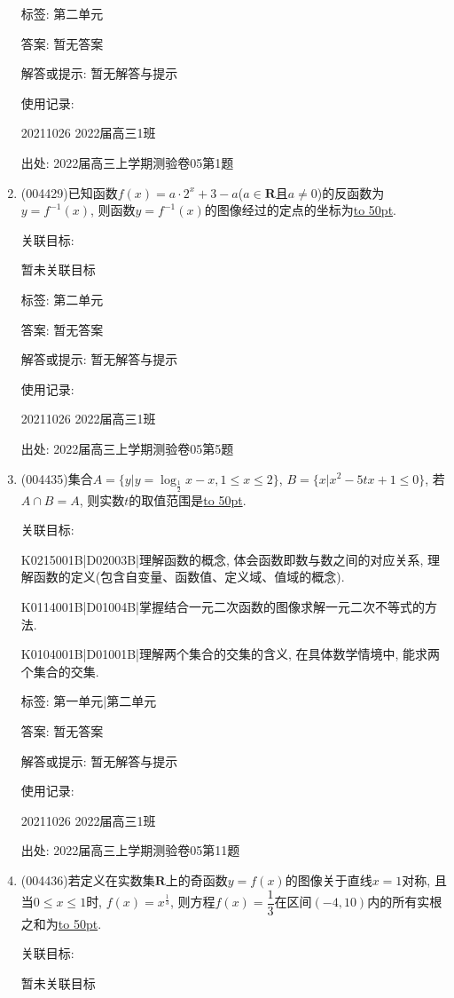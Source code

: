 \documentclass[10pt,a4paper]{article}
\newcommand{\blank}[1]{\underline{\hbox to #1pt{}}}
\begin{document}
\begin{enumerate}[1.]
标签: 第二单元

答案: 暂无答案

解答或提示: 暂无解答与提示

使用记录:

20211026	2022届高三1班	


出处: 2022届高三上学期测验卷05第1题
\item { (004429)}已知函数$f(x)=a\cdot 2^x+3-a$($a\in \mathbf{R}$且$a\ne 0$)的反函数为$y=f^{-1}(x)$, 则函数$y=f^{-1}(x)$的图像经过的定点的坐标为\blank{50}.


关联目标:

暂未关联目标



标签: 第二单元

答案: 暂无答案

解答或提示: 暂无解答与提示

使用记录:

20211026	2022届高三1班	


出处: 2022届高三上学期测验卷05第5题
\item { (004435)}集合$A=\{y|y=\log_{\frac 12}x-x,1\le x\le 2\}$, $B=\{x|x^2-5tx+1\le 0\}$, 若$A\cap B=A$, 则实数$t$的取值范围是\blank{50}.


关联目标:

K0215001B|D02003B|理解函数的概念, 体会函数即数与数之间的对应关系, 理解函数的定义(包含自变量、函数值、定义域、值域的概念).

K0114001B|D01004B|掌握结合一元二次函数的图像求解一元二次不等式的方法.

K0104001B|D01001B|理解两个集合的交集的含义, 在具体数学情境中, 能求两个集合的交集.



标签: 第一单元|第二单元

答案: 暂无答案

解答或提示: 暂无解答与提示

使用记录:

20211026	2022届高三1班	


出处: 2022届高三上学期测验卷05第11题
\item { (004436)}若定义在实数集$\mathbf{R}$上的奇函数$y=f(x)$的图像关于直线$x=1$对称, 且当$0\le x\le 1$时, $f(x)=x^{\frac 13}$, 则方程$f(x)=\dfrac 13$在区间$(-4,10)$内的所有实根之和为\blank{50}.


关联目标:

暂未关联目标




\end{enumerate}
\end{document}
